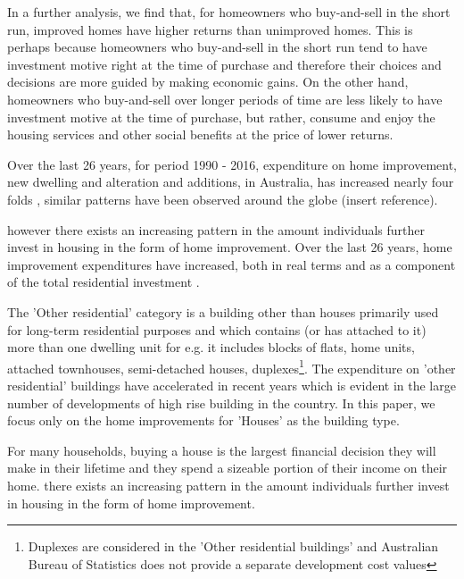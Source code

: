 


In a further analysis, we find that, for homeowners who buy-and-sell in the short run, improved homes have higher returns than unimproved homes. This is perhaps because homeowners who buy-and-sell in the short run tend to have investment motive right at the time of purchase and therefore their choices and decisions are more guided by making economic gains. On the other hand, homeowners who buy-and-sell over longer periods of time are less likely to have investment motive at the time of purchase, but rather, consume and enjoy the housing services and other social benefits at the price of lower returns.

Over the last 26 years, for period 1990 - 2016, expenditure on home improvement, new dwelling and alteration and additions, in Australia, has increased nearly four folds , similar patterns have been observed around the globe (insert reference). 

however there exists an increasing pattern in the amount individuals further invest in housing in the form of home improvement. Over the last 26 years, home improvement expenditures have increased, both in real terms and as a component of the total residential investment . 



The 'Other residential' category is a building other than houses primarily used for long-term residential purposes and which contains (or has attached to it) more than one dwelling unit for e.g. it includes blocks of flats, home units, attached townhouses, semi-detached houses, duplexes\footnote{Duplexes are considered in the 'Other residential buildings' and Australian Bureau of Statistics does not provide a separate development cost values}. The expenditure on 'other residential' buildings have accelerated in recent years which is evident in the large number of developments of high rise building in the country. In this paper, we focus only on the home improvements for 'Houses' as the building type. 


For many households, buying a house is the largest financial decision they will make in their lifetime and they spend a sizeable portion of their income on their home. there exists an increasing pattern in the amount individuals further invest in housing in the form of home improvement.




